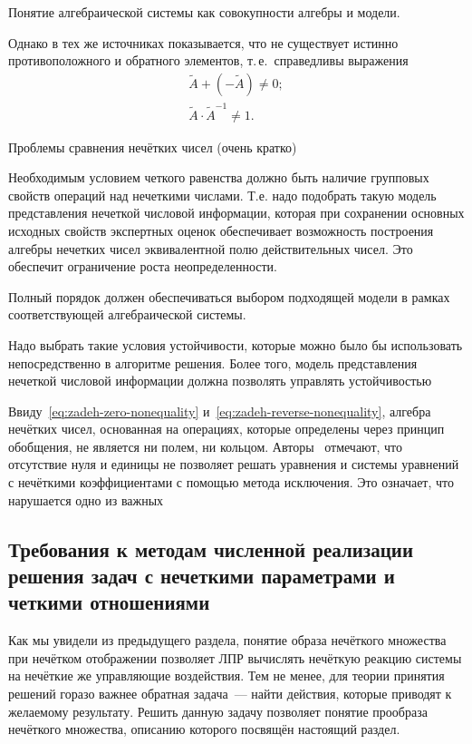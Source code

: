 Понятие алгебраической системы как совокупности алгебры и модели.

Однако в тех же источниках показывается, что не существует истинно противоположного и обратного элементов, т.\,е.~справедливы выражения
\begin{gather}
	\label{eq:zadeh-zero-nonequality}
	\tilde{A}+\left( -\tilde{A} \right)\ne 0; \\
	\label{eq:zadeh-reverse-nonequality}
	\tilde{A}\cdot {{\tilde{A}}^{-1}}\ne 1.
\end{gather}

Проблемы сравнения нечётких чисел (очень кратко)

 
Необходимым условием четкого равенства должно быть наличие групповых свойств операций над нечеткими числами. Т.е. надо подобрать такую модель представления нечеткой числовой информации, которая при сохранении основных исходных свойств экспертных оценок обеспечивает возможность построения алгебры нечетких чисел эквивалентной  полю действительных чисел. Это обеспечит ограничение роста неопределенности.

Полный порядок должен обеспечиваться выбором подходящей модели в рамках соответствующей алгебраической системы.

Надо выбрать такие условия устойчивости, которые можно было бы использовать непосредственно в алгоритме решения. Более того, модель представления нечеткой числовой информации должна позволять управлять устойчивостью

Ввиду~\eqref{eq:zadeh-zero-nonequality} и~\eqref{eq:zadeh-reverse-nonequality}, алгебра нечётких чисел, основанная на операциях, которые определены через принцип обобщения, не является ни полем, ни кольцом. Авторы~\cite{Rutkovskaya} отмечают, что отсутствие нуля и единицы не позволяет решать уравнения и системы уравнений с нечёткими коэффициентами с помощью метода исключения. Это означает, что нарушается одно из важных


\subsection{Требования к методам численной реализации решения задач с нечеткими параметрами и четкими отношениями}

Как мы увидели из предыдущего раздела, понятие образа нечёткого множества при нечётком отображении позволяет ЛПР вычислять нечёткую реакцию системы на нечёткие же управляющие воздействия. Тем не менее, для теории принятия решений горазо важнее обратная задача~--- найти действия, которые приводят к желаемому результату. Решить данную задачу позволяет понятие прообраза нечёткого множества, описанию которого посвящён настоящий раздел.

